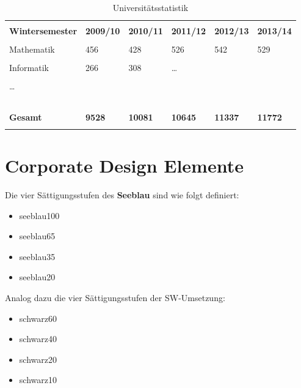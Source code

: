 \documentclass[11pt, rgb]{scrreprt}
\begin{document}
\begin{table}
\caption{Universitätsstatistik}
\label{tbl:Uni}
\begin{tabu} {X[l]X[r]X[r]X[r]X[r]X[r]}
\unitoprule \\
\textbf{Wintersemester} & \textbf{2009/10} & \textbf{2010/11} & \textbf{2011/12} & \textbf{2012/13} & \textbf{2013/14} \\
\unitoprule \\
Mathematik & 456 & 428 & 526 & 542 & 529 \\
\unimidrule \\
Informatik & 266 & 308 & \ldots \\
\unimidrule \\
\ldots \\
\unimidrule \\
 \\
\unimidrule \\
 \\
\unitoprule \\
\textbf{Gesamt} & \textbf{9528} & \textbf{10081} & \textbf{10645} & \textbf{11337} & \textbf{11772} \\
\unitoprule \\
\end{tabu}
\end{table}

\normalsize

\chapter{Corporate Design Elemente}

Die vier Sättigungsstufen des \textbf{Seeblau} sind wie folgt definiert:

\begin{itemize}
\item \textcolor{seeblau100}{seeblau100}
\item \textcolor{seeblau65}{seeblau65}
\item \textcolor{seeblau35}{seeblau35}
\item \textcolor{seeblau20}{seeblau20}\\
\end{itemize}

\noindent Analog dazu die vier Sättigungsstufen der SW-Umsetzung:

\begin{itemize}
\item \textcolor{schwarz60}{schwarz60}
\item \textcolor{schwarz40}{schwarz40}
\item \textcolor{schwarz20}{schwarz20}
\item \textcolor{schwarz10}{schwarz10}\\
\end{itemize}
\end{document}
